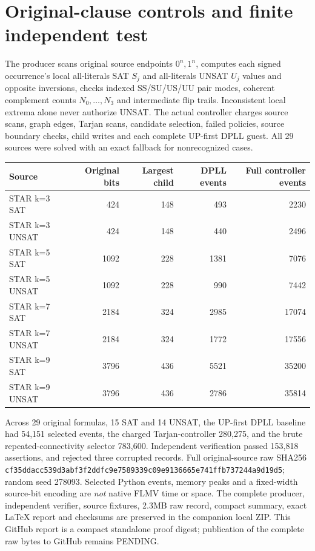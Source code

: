 \documentclass[11pt]{article}
\begin{document}
\section*{Original-clause controls and finite independent test}
The producer scans original source endpoints $0^n,1^n$, computes each signed occurrence's local all-literals SAT $S_j$ and all-literals UNSAT $U_j$ values and opposite inversions, checks indexed SS/SU/US/UU pair modes, coherent complement counts $N_0,\ldots,N_3$ and intermediate flip trails. Inconsistent local extrema alone never authorize UNSAT. The actual controller charges source scans, graph edges, Tarjan scans, candidate selection, failed policies, source boundary checks, child writes and each complete UP-first DPLL guest. All 29 sources were solved with an exact fallback for nonrecognized cases.
\begin{center}\small\begin{tabular}{lrrrr}\toprule
Source & Original bits & Largest child & DPLL events & Full controller events\\\midrule
STAR k=3 SAT &424&148&493&2230\\
STAR k=3 UNSAT &424&148&440&2496\\
STAR k=5 SAT &1092&228&1381&7076\\
STAR k=5 UNSAT &1092&228&990&7442\\
STAR k=7 SAT &2184&324&2985&17074\\
STAR k=7 UNSAT &2184&324&1772&17556\\
STAR k=9 SAT &3796&436&5521&35200\\
STAR k=9 UNSAT &3796&436&2786&35814\\\bottomrule
\end{tabular}\end{center}
Across 29 original formulas, 15 SAT and 14 UNSAT, the UP-first DPLL baseline had 54,151 selected events, the charged Tarjan-controller 280,275, and the brute repeated-connectivity selector 783,600. Independent verification passed 153,818 assertions, and rejected three corrupted records. Full original-source raw SHA256 \texttt{cf35ddacc539d3abf3f2ddfc9e7589339c09e9136665e741ffb737244a9d19d5}; random seed 278093. Selected Python events, memory peaks and a fixed-width source-bit encoding are \emph{not} native FLMV time or space. The complete producer, independent verifier, source fixtures, 2.3MB raw record, compact summary, exact LaTeX report and checksums are preserved in the companion local ZIP. This GitHub report is a compact standalone proof digest; publication of the complete raw bytes to GitHub remains PENDING.
\end{document}
